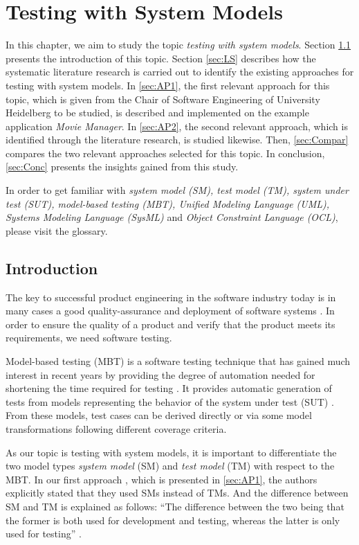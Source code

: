 \chapter{Testing with System Models}
\label{sec:topic_7}

In this chapter, we aim to study the topic \textit{testing with  system models}. Section \ref{sec:Intro7} presents the introduction of this topic. Section \ref{sec:LS} describes how the systematic literature research is carried out to identify the existing approaches for testing with system models. In \autoref{sec:AP1}, the first relevant approach for this topic, which is given from the Chair of Software Engineering of University Heidelberg to be studied, is described and implemented on the example application \textit{Movie Manager}. In \autoref{sec:AP2}, the second relevant approach, which is identified through the literature research, is studied likewise. Then, \autoref{sec:Compar} compares the two relevant approaches selected for this topic. In conclusion, \autoref{sec:Conc} presents the insights gained from this study.

In order to get familiar with \textit{system model (SM), test model (TM), system under test (SUT), model-based testing (MBT), Unified Modeling Language (UML), Systems Modeling Language (SysML)} and \textit{Object Constraint Language (OCL)}, please visit the glossary.


\section{Introduction}
\label{sec:Intro7}

The key to successful product engineering in the software industry today is in many cases a good quality-assurance and deployment of software systems \cite{Paper1}. In order to ensure the quality of a product and verify that the product meets its requirements, we need software testing. 

Model-based testing (MBT) is a software testing technique that has gained much interest in recent years by providing the degree of automation needed for shortening the time required for testing \cite{Paper1}. It provides automatic generation of tests from models representing the behavior of the system under test (SUT) \cite{matera}. From these models, test cases can be derived directly or via some model transformations following different coverage criteria. 

As our topic is testing with system models, it is important to differentiate the two model types \textit{system model} (SM) and \textit{test model} (TM) with respect to the MBT. In our first approach \cite{Paper1}, which is presented in \autoref{sec:AP1}, the authors explicitly stated that they used SMs instead of TMs. And the difference between SM and TM is explained as follows: \enquote{The difference between the two being that the former is both used for development and testing, whereas the latter is only used for testing} \cite{Paper1}. 

